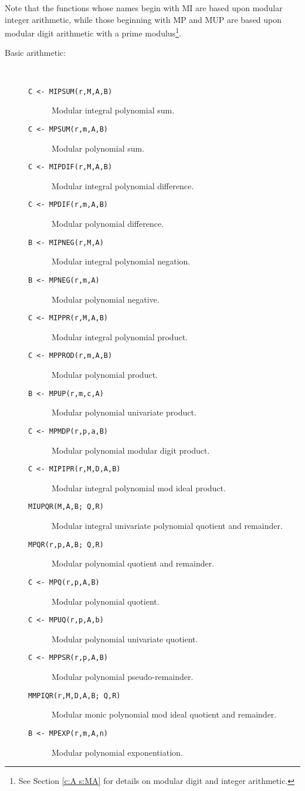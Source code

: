 Note that the functions whose names begin with MI are based upon modular
integer arithmetic, while those beginning with MP and MUP are based upon modular
digit arithmetic with a prime modulus\footnote{
  See Section \ref{c:A s:MA} for details on modular digit and integer
  arithmetic.
}.


\begin{description}
\item[Basic arithmetic:] \ \
  \begin{description}
  \item[{\tt C <- MIPSUM(r,M,A,B) 
}]  Modular integral polynomial sum.
  \item[{\tt C <- MPSUM(r,m,A,B) 
}]  Modular polynomial sum.
  \item[{\tt C <- MIPDIF(r,M,A,B) 
}]  Modular integral polynomial difference.
  \item[{\tt C <- MPDIF(r,m,A,B) 
}]  Modular polynomial difference.
  \item[{\tt B <- MIPNEG(r,M,A) 
}]  Modular integral polynomial negation.
  \item[{\tt B <- MPNEG(r,m,A) 
}]  Modular polynomial negative.
  \item[{\tt C <- MIPPR(r,M,A,B) 
}]  Modular integral polynomial product.
  \item[{\tt C <- MPPROD(r,m,A,B) 
}]  Modular polynomial product.
  \item[{\tt B <- MPUP(r,m,c,A) 
}]  Modular polynomial univariate product.
  \item[{\tt C <- MPMDP(r,p,a,B) 
}]  Modular polynomial modular digit product.
  \item[{\tt C <- MIPIPR(r,M,D,A,B) 
}]  Modular integral polynomial mod ideal product.
  \item[{\tt  MIUPQR(M,A,B; Q,R) 
}]  Modular integral univariate polynomial quotient and
  remainder.
  \item[{\tt  MPQR(r,p,A,B; Q,R) 
}]  Modular polynomial quotient and remainder.
  \item[{\tt C <- MPQ(r,p,A,B) 
}]  Modular polynomial quotient.
  \item[{\tt C <- MPUQ(r,p,A,b) 
}]  Modular polynomial univariate quotient.
  \item[{\tt C <- MPPSR(r,p,A,B) 
}]  Modular polynomial pseudo-remainder.
  \item[{\tt  MMPIQR(r,M,D,A,B; Q,R) 
}]  Modular monic polynomial mod ideal quotient and remainder.
  \item[{\tt B <- MPEXP(r,m,A,n) 
}]  Modular polynomial exponentiation.
  \end{description}


\end{description}
